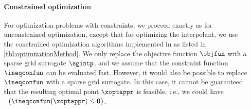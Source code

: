 \paragraph{Constrained optimization}

For optimization problems with constraints,
we proceed exactly as for unconstrained optimization,
except that for optimizing the interpolant, we use the
constrained optimization algorithms implemented in \sgpp
as listed in \cref{tbl:optimizationMethod}.
We only replace the objective function $\objfun$ with a sparse grid
surrogate $\sgintp$, and we assume that the constraint function
$\ineqconfun$ can be evaluated fast.
However, it would also be possible to replace $\ineqconfun$
with a sparse grid surrogate.
In this case, it cannot be guaranteed that the resulting optimal point
$\xoptappr$ is feasible, i.e., we could have
$\lnot(\ineqconfun(\xoptappr) \le \*0)$.
